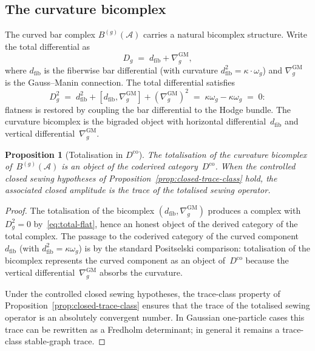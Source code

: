 \documentclass[11pt,reqno]{amsart}
\newtheorem{proposition}[theorem]{Proposition}
\theoremstyle{definition}
\theoremstyle{remark}
\newcommand{\cA}{\mathcal{A}}
\newcommand{\Dco}{D^{\mathrm{co}}}
\numberwithin{equation}{section}
\begin{document}
\subsection{The curvature bicomplex}\label{subsec:curvature-bicomplex}

The curved bar complex $B^{(g)}(\cA)$ carries a natural
bicomplex structure.  Write the total differential as
\[
D_g \;=\; d_{\mathrm{fib}} + \nabla^{\mathrm{GM}}_g,
\]
where $d_{\mathrm{fib}}$ is the fiberwise bar differential
(with curvature $d_{\mathrm{fib}}^2 = \kappa \cdot \omega_g$)
and $\nabla^{\mathrm{GM}}_g$ is the Gauss--Manin connection.
The total differential satisfies
\begin{equation}\label{eq:total-flat}
D_g^2
\;=\;
d_{\mathrm{fib}}^2
+ [d_{\mathrm{fib}}, \nabla^{\mathrm{GM}}_g]
+ (\nabla^{\mathrm{GM}}_g)^2
\;=\;
\kappa\omega_g - \kappa\omega_g
\;=\; 0:
\end{equation}
flatness is restored by coupling the bar differential to the
Hodge bundle.  The curvature bicomplex is the bigraded object
with horizontal differential~$d_{\mathrm{fib}}$ and vertical
differential~$\nabla^{\mathrm{GM}}_g$.

\begin{proposition}[Totalisation in $\Dco$]
\label{prop:totalisation}
The totalisation of the curvature bicomplex of~$B^{(g)}(\cA)$
is an object of the coderived category~$\Dco$.  When the controlled
closed sewing hypotheses of Proposition~\ref{prop:closed-trace-class}
hold, the associated closed amplitude is the trace of the totalised
sewing operator.
\end{proposition}

\begin{proof}
The totalisation of the bicomplex
$(d_{\mathrm{fib}}, \nabla^{\mathrm{GM}}_g)$ produces a
complex with $D_g^2 = 0$ by~\eqref{eq:total-flat}, hence an
honest object of the derived category of the total complex.
The passage to the coderived category of the curved
component~$d_{\mathrm{fib}}$ (with
$d_{\mathrm{fib}}^2 = \kappa\omega_g$) is by the standard
Positselski comparison: totalisation of the bicomplex
represents the curved component as an object of~$\Dco$
because the vertical differential~$\nabla^{\mathrm{GM}}_g$
absorbs the curvature.

Under the controlled closed sewing hypotheses, the trace-class
property of Proposition~\ref{prop:closed-trace-class} ensures that
the trace of the totalised sewing operator is an absolutely
convergent number. In Gaussian one-particle cases this trace can be
rewritten as a Fredholm determinant; in general it remains a
trace-class stable-graph trace.
\end{proof}
\end{document}
